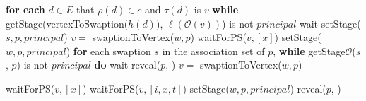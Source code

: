 \begin{enumerate}
\begin{algorithm}[H]
\begin{algorithmic}
        \State \textbf{for each} $d \in E$ that $\rho(d) \in c$ and $\tau(d)$ is $v$ \textbf{while} getStage(vertexToSwaption($h(d)$), $\ell(\mathcal{O}(v))$) is not $principal$ wait
        \EndFunction
        \State setStage($s, p, principal$)
        \EndFor
        \State $v = $ swaptionToVertex($w, p$)
        \State waitForPS($v, [x]$)
        \State setStage($w, p, principal$)
        \EndFor
        \State \textbf{for} each swaption $s$ in the association set of $p$, \textbf{while}
        getStage$\mathcal{O}$($s$, $p$)
        is not $principal$ \textbf{do} wait
        \State reveal($p$, \keyone)
        \Else
        \State $v = $ swaptionToVertex($w, p$)
        
        \end{algorithmic}
        \end{algorithm}
        
        \begin{algorithm}[H]
        \begin{algorithmic}
        
        \State waitForPS($v, [x]$)
        \Else
        \State waitForPS($v, [i, x, t]$)
        \EndIf
        \State setStage($w, p, principal$)
        \EndFor
        \EndWhile
        \State reveal($p$, \keyone)

        \EndIf
        

\end{algorithmic}
\end{algorithm}
\end{enumerate}
